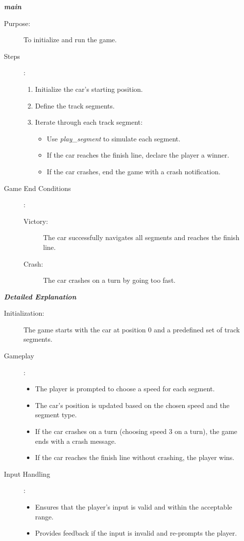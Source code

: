 \documentclass[12pt]{article}
\begin{document}
\textit{\textbf{main}}
\begin{description}
    \item[Purpose:] To initialize and run the game.
    \item[Steps]:
    \begin{enumerate}
        \item Initialize the car's starting position.
        \item Define the track segments.
        \item Iterate through each track segment:
        \begin{itemize}
            \item Use \textit{play\_segment} to simulate each segment.
            \item If the car reaches the finish line, declare the player a winner.
            \item If the car crashes, end the game with a crash notification.
        \end{itemize}
    \end{enumerate}
    \item[Game End Conditions]:
    \begin{description}
        \item[Victory:] The car successfully navigates all segments and reaches the finish line.
        \item[Crash:] The car crashes on a turn by going too fast.
    \end{description}
\end{description}

\textit{\textbf{Detailed Explanation}}
\begin{description}
    \item[Initialization:] The game starts with the car at position 0 and a predefined set of track segments.
    \item[Gameplay]:
    \begin{itemize}
        \item The player is prompted to choose a speed for each segment.
        \item The car's position is updated based on the chosen speed and the segment type.
        \item If the car crashes on a turn (choosing speed 3 on a turn), the game ends with a crash message.
        \item If the car reaches the finish line without crashing, the player wins.
    \end{itemize}
    \item[Input Handling]:
    \begin{itemize}
        \item Ensures that the player's input is valid and within the acceptable range.
        \item Provides feedback if the input is invalid and re-prompts the player.
    \end{itemize}
\end{description}
\end{document}
